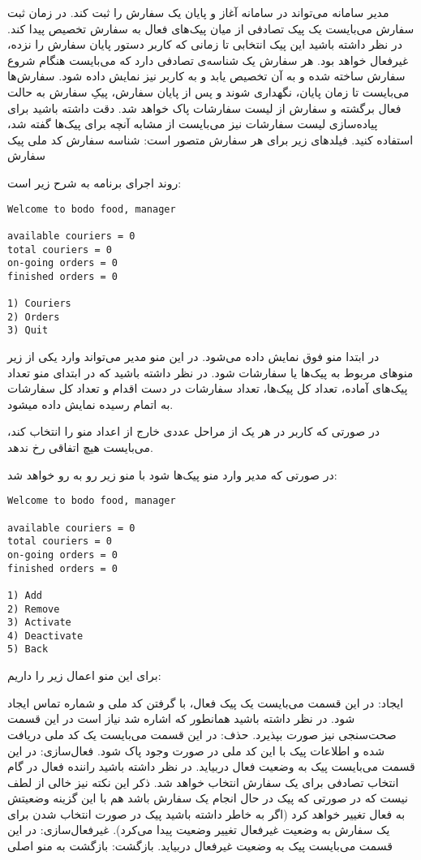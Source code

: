 
مدیر سامانه می‌تواند در سامانه آغاز و پایان یک سفارش را ثبت کند. در زمان ثبت سفارش می‌بایست یک پیک تصادفی از میان پیک‌های فعال به سفارش تخصیص پیدا کند. در نظر داشته باشید این پیک انتخابی تا زمانی که کاربر دستور پایان سفارش را نزده، غیرفعال خواهد بود.
هر سفارش یک شناسه‌ی تصادفی دارد که می‌بایست هنگام شروع سفارش ساخته شده و به آن تخصیص یابد و به کاربر نیز نمایش داده شود. سفارش‌ها می‌بایست تا زمان پایان، نگهداری شوند و پس از پایان سفارش، پیکِ سفارش به حالت فعال برگشته و سفارش از لیست سفارشات پاک خواهد شد. دقت داشته باشید برای پیاده‌سازی لیست سفارشات نیز می‌بایست از مشابه آنچه برای پیک‌ها گفته شد، استفاده کنید.
فیلدهای زیر برای هر سفارش متصور است:
 شناسه سفارش
 کد ملی پیک سفارش

روند اجرای برنامه به شرح زیر است:

\begin{latin}
\begin{verbatim}
Welcome to bodo food, manager

available couriers = 0
total couriers = 0
on-going orders = 0
finished orders = 0

1) Couriers
2) Orders
3) Quit
\end{verbatim}
\end{latin}

در ابتدا منو فوق نمایش داده می‌شود. در این منو مدیر می‌تواند وارد یکی از زیر منوهای مربوط به پیک‌ها یا سفارشات شود.
در نظر داشته باشید که در ابتدای منو تعداد پیک‌های آماده، تعداد کل پیک‌ها، تعداد سفارشات در دست اقدام و تعداد کل سفارشات به اتمام رسیده نمایش داده میشود.

در صورتی که کاربر در هر یک از مراحل عددی خارج از اعداد منو را انتخاب کند، می‌بایست هیچ اتفاقی رخ ندهد.

در صورتی که مدیر وارد منو پیک‌ها شود با منو زیر رو به رو خواهد شد:

\begin{latin}
\begin{verbatim}
Welcome to bodo food, manager

available couriers = 0
total couriers = 0
on-going orders = 0
finished orders = 0

1) Add
2) Remove
3) Activate
4) Deactivate
5) Back
\end{verbatim}
\end{latin}

برای این منو اعمال زیر را داریم:

 ایجاد: در این قسمت می‌بایست یک پیک فعال، با گرفتن کد ملی و شماره تماس ایجاد شود. در نظر داشته باشید همانطور که اشاره شد نیاز است در این قسمت صحت‌سنجی نیز صورت بپذیرد.
 حذف:‌ در این قسمت می‌بایست یک کد ملی دریافت شده و اطلاعات پیک با این کد ملی در صورت وجود پاک شود.
 فعال‌سازی: در این قسمت می‌بایست پیک به وضعیت فعال دربیاید. در نظر داشته باشید راننده فعال در گام انتخاب تصادفی برای یک سفارش انتخاب خواهد شد. ذکر این نکته نیز خالی از لطف نیست که در صورتی که پیک در حال انجام یک سفارش باشد هم با این گزینه وضعیتش به فعال تغییر خواهد کرد (اگر به خاطر داشته باشید پیک در صورت انتخاب شدن برای یک سفارش به وضعیت غیرفعال تغییر وضعیت پیدا می‌کرد).
 غیرفعال‌سازی:‌ در این قسمت می‌بایست پیک به وضعیت غیرفعال دربیاید.
 بازگشت: بازگشت به منو اصلی

